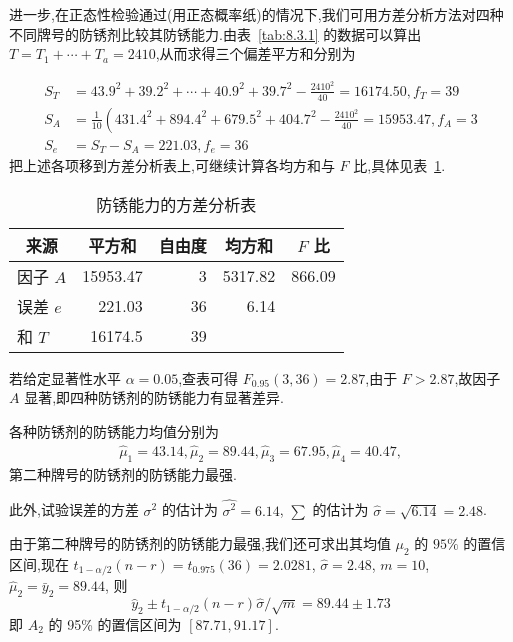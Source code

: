 \begin{example}
进一步,在正态性检验通过(用正态概率纸)的情况下,我们可用方差分析方法对四种不同牌号的防锈剂比较其防锈能力.由表~\ref{tab:8.3.1} 的数据可以算出 $T = T_1 + \cdots + T_a = 2410$,从而求得三个偏差平方和分别为

\begin{align*}
S_{T} & =43.9^{2}+39.2^{2}+\cdots+40.9^{2}+39.7^{2}-\frac{2410^{2}}{40}=16174.50, f_{T}=39 \\
S_{A} & =\frac{1}{10}\left(431.4^{2}+894.4^{2}+679.5^{2}+404.7^{2}-\frac{2410^{2}}{40}=15953.47, f_{A}=3\right. \\
S_{e} & =S_{T}-S_{A}=221.03, f_{e} = 36
\end{align*}
把上述各项移到方差分析表上,可继续计算各均方和与 $F$ 比,具体见表~\ref{tab:8.3.2}.

\begin{table}[htbp]
  \centering
  \caption{防锈能力的方差分析表}
    \begin{tabular}{lrrrr}
    \toprule
    \multicolumn{1}{c}{来源} & \multicolumn{1}{c}{平方和} & \multicolumn{1}{c}{自由度} & \multicolumn{1}{c}{均方和} & \multicolumn{1}{c}{$F$ 比} \\
    \midrule
    因子 $A$   & 15953.47 & 3     & 5317.82 & 866.09 \\
    误差 $e$   & 221.03 & 36    & 6.14  &  \\
    和 $T$    & 16174.5 & 39    &       &  \\
    \bottomrule
    \end{tabular}%
  \label{tab:8.3.2}%
\end{table}%


若给定显著性水平 $\alpha = 0.05$,查表可得 $F_{0.95}(3,36)=2.87$,由于 $F>2.87$,故因子 $A$ 显著,即四种防锈剂的防锈能力有显著差异.

各种防锈剂的防锈能力均值分别为
\begin{gather*}
\hat{\mu}_1=43.14, \hat{\mu}_2=89.44, \hat{\mu}_3=67.95, \hat{\mu}_4 = 40.47,
\end{gather*}
第二种牌号的防锈剂的防锈能力最强.

此外,试验误差的方差 $\sigma^2$ 的估计为 $\hat{\sigma^2}=6.14$, $\sum$ 的估计为 $\hat{\sigma}=\sqrt{6.14}=
2.48$.

由于第二种牌号的防锈剂的防锈能力最强,我们还可求出其均值 $\mu_2$ 的 $95\%$ 的置信区间,现在 $t_{1-\alpha/2}(n-r)=t_{0.975}(36)=2.0281$, $\hat{\sigma}=2.48$, $m=10$, $\hat{\mu}_2=\bar{y}_2=89.44$, 则
\begin{equation*}
  \hat{y}_{2} \pm t_{1-\alpha / 2}(n-r) \hat{\sigma} / \sqrt{m}=89.44 \pm 1.73
\end{equation*}
即 $A_2$ 的 95\% 的置信区间为 $[87.71, 91.17]$.
\end{example}

